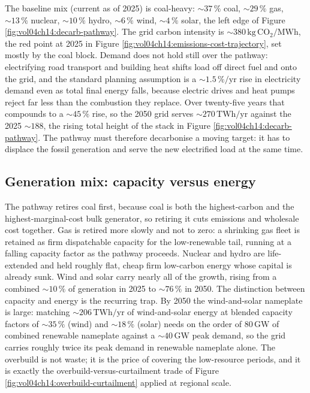 The baseline mix (current as of 2025) is coal-heavy: $\sim 37\,\%$ coal,
$\sim 29\,\%$ gas, $\sim 13\,\%$ nuclear, $\sim 10\,\%$ hydro, $\sim 6\,\%$
wind, $\sim 4\,\%$ solar, the left edge of Figure
\ref{fig:vol04ch14:decarb-pathway}. The grid carbon intensity is $\sim
380\,\si{\kilogram}\,\text{CO}_2/\si{\mega\watt\hour}$, the red point at
2025 in Figure \ref{fig:vol04ch14:emissions-cost-trajectory}, set mostly by
the coal block. Demand does not hold still over the pathway: electrifying
road transport and building heat shifts load off direct fuel and onto the
grid, and the standard planning assumption is a $\sim 1.5\,\%/\text{yr}$
rise in electricity demand even as total final energy falls, because
electric drives and heat pumps reject far less than the combustion they
replace. Over twenty-five years that compounds to a $\sim 45\,\%$ rise, so
the 2050 grid serves $\sim 270\,\text{TWh}/\text{yr}$ against the 2025
$\sim 188$, the rising total height of the stack in Figure
\ref{fig:vol04ch14:decarb-pathway}. The pathway must therefore decarbonise
a moving target: it has to displace the fossil generation and serve the
new electrified load at the same time.

\subsection{Generation mix: capacity versus energy}

The pathway retires coal first, because coal is both the highest-carbon and
the highest-marginal-cost bulk generator, so retiring it cuts emissions and
wholesale cost together. Gas is retired more slowly and not to zero: a
shrinking gas fleet is retained as firm dispatchable capacity for the
low-renewable tail, running at a falling capacity factor as the pathway
proceeds. Nuclear and hydro are life-extended and held roughly flat,
cheap firm low-carbon energy whose capital is already sunk. Wind and solar
carry nearly all of the growth, rising from a combined $\sim 10\,\%$
of generation in 2025 to $\sim 76\,\%$ in 2050. The distinction between
capacity and energy is the recurring trap. By 2050 the wind-and-solar
nameplate is large: matching $\sim 206\,\text{TWh}/\text{yr}$ of
wind-and-solar energy at blended capacity factors of $\sim 35\,\%$ (wind)
and $\sim 18\,\%$ (solar) needs on the order of $80\,\si{\giga\watt}$ of
combined renewable nameplate against a $\sim 40\,\si{\giga\watt}$ peak
demand, so the grid carries roughly twice its peak demand in renewable
nameplate alone. The overbuild is not waste; it is the price of covering
the low-resource periods, and it is exactly the overbuild-versus-curtailment
trade of Figure \ref{fig:vol04ch14:overbuild-curtailment} applied at
regional scale.

